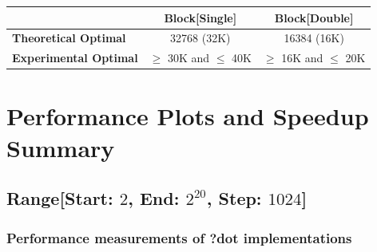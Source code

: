 \begin{tabular}{l|c|c|}
    & \textbf{Block[Single]} & \textbf{Block[Double]}\\
    \hline
    \textbf{Theoretical Optimal} & 32768 (32K) & 16384 (16K)\\
    \hline
    \textbf{Experimental Optimal} & $\geq$ 30K and $\leq$ 40K & $\geq$ 16K and $\leq$ 20K\\
    \hline
\end{tabular}

\section{Performance Plots and Speedup Summary}

\subsection{Range[Start: $2$, End: $2^{20}$, Step: $1024$]}

\subsubsection{Performance measurements of ?dot implementations}
\begin{figure}[htb]
    \centering
    \label{fig:dot_Sgflop220}
    \qquad
    \label{fig:dot_Dgflop220}
\end{figure}

\newpage
